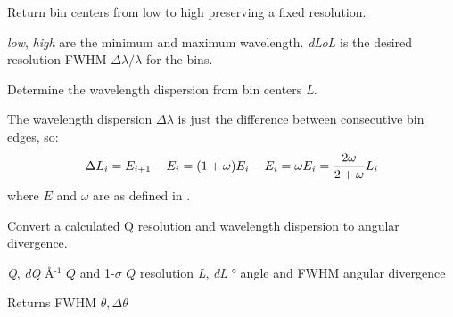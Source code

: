 \documentclass[letterpaper,10pt,english]{sphinxmanual}
\begin{document}
\begin{fulllineitems}
\label{api/resolution:refl1d.resolution.bins}
Return bin centers from low to high preserving a fixed resolution.

\emph{low}, \emph{high} are the minimum and maximum wavelength.
\emph{dLoL} is the desired resolution FWHM $\Delta\lambda/\lambda$ for the bins.

\end{fulllineitems}


\begin{fulllineitems}
\label{api/resolution:refl1d.resolution.binwidths}
Determine the wavelength dispersion from bin centers \emph{L}.

The wavelength dispersion $\Delta\lambda$ is just the difference
between consecutive bin edges, so:
\begin{gather}
\begin{split}\Delta L_i  = E_{i+1}-E_{i}
            = (1+\omega) E_i - E_i
            = \omega E_i
            = \frac{2 \omega}{2+\omega} L_i\end{split}\notag
\end{gather}
where $E$ and $\omega$ are as defined in {\hyperref[api/resolution:refl1d.resolution.binedges]{}}.

\end{fulllineitems}


\begin{fulllineitems}
\label{api/resolution:refl1d.resolution.dQdL2dT}
Convert a calculated Q resolution and wavelength dispersion to
angular divergence.

\emph{Q}, \emph{dQ} Å$^{\text{-1}}$  $Q$ and 1-$\sigma$ $Q$ resolution
\emph{L}, \emph{dL} ° angle and FWHM angular divergence

Returns FWHM $\theta, \Delta\theta$

\end{fulllineitems}

\end{document}
